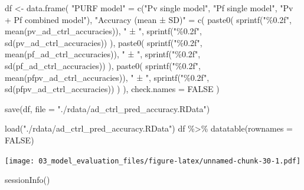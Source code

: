\documentclass[
  11pt,
  oneside]{book}
\newenvironment{Shaded}{\begin{snugshade}}{\end{snugshade}}
\newcommand{\AttributeTok}[1]{\textcolor[rgb]{0.77,0.63,0.00}{#1}}
\newcommand{\ConstantTok}[1]{\textcolor[rgb]{0.00,0.00,0.00}{#1}}
\newcommand{\FunctionTok}[1]{\textcolor[rgb]{0.00,0.00,0.00}{#1}}
\newcommand{\NormalTok}[1]{#1}
\newcommand{\OtherTok}[1]{\textcolor[rgb]{0.56,0.35,0.01}{#1}}
\newcommand{\SpecialCharTok}[1]{\textcolor[rgb]{0.00,0.00,0.00}{#1}}
\newcommand{\StringTok}[1]{\textcolor[rgb]{0.31,0.60,0.02}{#1}}
\begin{document}
\begin{Shaded}
\begin{Highlighting}[]
\NormalTok{df }\OtherTok{\textless{}{-}} \FunctionTok{data.frame}\NormalTok{(}
  \StringTok{"PURF model"} \OtherTok{=} \FunctionTok{c}\NormalTok{(}\StringTok{"Pv single model"}\NormalTok{, }\StringTok{"Pf single model"}\NormalTok{, }\StringTok{"Pv + Pf combined model"}\NormalTok{),}
  \StringTok{"Accuracy (mean ± SD)"} \OtherTok{=} \FunctionTok{c}\NormalTok{(}
    \FunctionTok{paste0}\NormalTok{(}
      \FunctionTok{sprintf}\NormalTok{(}\StringTok{"\%0.2f"}\NormalTok{, }\FunctionTok{mean}\NormalTok{(pv\_ad\_ctrl\_accuracies)), }\StringTok{" ± "}\NormalTok{,}
      \FunctionTok{sprintf}\NormalTok{(}\StringTok{"\%0.2f"}\NormalTok{, }\FunctionTok{sd}\NormalTok{(pv\_ad\_ctrl\_accuracies))}
\NormalTok{    ),}
    \FunctionTok{paste0}\NormalTok{(}
      \FunctionTok{sprintf}\NormalTok{(}\StringTok{"\%0.2f"}\NormalTok{, }\FunctionTok{mean}\NormalTok{(pf\_ad\_ctrl\_accuracies)), }\StringTok{" ± "}\NormalTok{,}
      \FunctionTok{sprintf}\NormalTok{(}\StringTok{"\%0.2f"}\NormalTok{, }\FunctionTok{sd}\NormalTok{(pf\_ad\_ctrl\_accuracies))}
\NormalTok{    ),}
    \FunctionTok{paste0}\NormalTok{(}
      \FunctionTok{sprintf}\NormalTok{(}\StringTok{"\%0.2f"}\NormalTok{, }\FunctionTok{mean}\NormalTok{(pfpv\_ad\_ctrl\_accuracies)), }\StringTok{" ± "}\NormalTok{,}
      \FunctionTok{sprintf}\NormalTok{(}\StringTok{"\%0.2f"}\NormalTok{, }\FunctionTok{sd}\NormalTok{(pfpv\_ad\_ctrl\_accuracies))}
\NormalTok{    )}
\NormalTok{  ),}
  \AttributeTok{check.names =} \ConstantTok{FALSE}
\NormalTok{)}

\FunctionTok{save}\NormalTok{(df, }\AttributeTok{file =} \StringTok{"./rdata/ad\_ctrl\_pred\_accuracy.RData"}\NormalTok{)}
\end{Highlighting}
\end{Shaded}

\begin{Shaded}
\begin{Highlighting}[]
\FunctionTok{load}\NormalTok{(}\StringTok{"./rdata/ad\_ctrl\_pred\_accuracy.RData"}\NormalTok{)}
\NormalTok{df }\SpecialCharTok{\%\textgreater{}\%}
  \FunctionTok{datatable}\NormalTok{(}\AttributeTok{rownames =} \ConstantTok{FALSE}\NormalTok{)}
\end{Highlighting}
\end{Shaded}

\texttt{[image: 03\_model\_evaluation\_files/figure-latex/unnamed-chunk-30-1.pdf]}

\begin{Shaded}
\begin{Highlighting}[]
\FunctionTok{sessionInfo}\NormalTok{()}
\end{Highlighting}
\end{Shaded}
\end{document}
